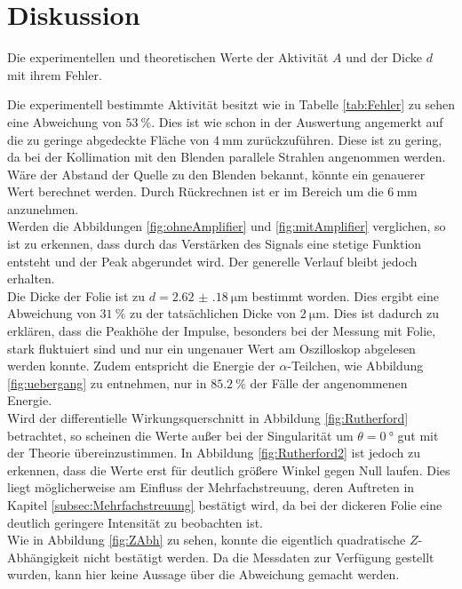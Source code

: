 \section{Diskussion}
\label{sec:Diskussion}

\begin{table}
	\centering
	\caption{Die experimentellen und theoretischen Werte der Aktivität $A$ und der Dicke $d$ mit ihrem Fehler.}
	
	\label{tab:Fehler}
\end{table}

\noindent Die experimentell bestimmte Aktivität besitzt wie in Tabelle \ref{tab:Fehler} zu sehen eine Abweichung von $\SI{53}{\%}$. Dies ist wie schon in der Auswertung angemerkt auf die zu geringe abgedeckte Fläche von $\SI{4}{\milli\metre}$ zurückzuführen. Diese ist zu gering, da bei der Kollimation mit den Blenden parallele Strahlen angenommen werden. Wäre der Abstand der Quelle zu den Blenden bekannt, könnte ein genauerer Wert berechnet werden. Durch Rückrechnen ist er im Bereich um die $\SI{6}{\milli\metre}$ anzunehmen.\\
Werden die Abbildungen \ref{fig:ohneAmplifier} und \ref{fig:mitAmplifier} verglichen, so ist zu erkennen, dass durch das Verstärken des Signals eine stetige Funktion entsteht und der Peak abgerundet wird. Der generelle Verlauf bleibt jedoch erhalten.\\
Die Dicke der Folie ist zu $d=\SI{2.62(18)}{\micro\metre}$ bestimmt worden. Dies ergibt eine Abweichung von $\SI{31}{\%}$ zu der tatsächlichen Dicke von $\SI{2}{\micro\metre}$. Dies ist dadurch zu erklären, dass die Peakhöhe der Impulse, besonders bei der Messung mit Folie, stark fluktuiert sind und nur ein ungenauer Wert am Oszilloskop abgelesen werden konnte. Zudem entspricht die Energie der $\alpha$-Teilchen, wie Abbildung \ref{fig:uebergang} zu entnehmen, nur in $\SI{85,2}{\%}$ der Fälle der angenommenen Energie.\\
Wird der differentielle Wirkungsquerschnitt in Abbildung \ref{fig:Rutherford} betrachtet, so scheinen die Werte außer bei der Singularität um $\theta=\SI{0}{\degree}$ gut mit der Theorie übereinzustimmen. In Abbildung \ref{fig:Rutherford2} ist jedoch zu erkennen, dass die Werte erst für deutlich größere Winkel gegen Null laufen. Dies liegt möglicherweise am Einfluss der Mehrfachstreuung, deren Auftreten in Kapitel \ref{subsec:Mehrfachstreuung} bestätigt wird, da bei der dickeren Folie eine deutlich geringere Intensität zu beobachten ist.\\
Wie in Abbildung \ref{fig:ZAbh} zu sehen, konnte die eigentlich quadratische $Z$-Abhängigkeit nicht bestätigt werden. Da die Messdaten zur Verfügung gestellt wurden, kann hier keine Aussage über die Abweichung gemacht werden.
